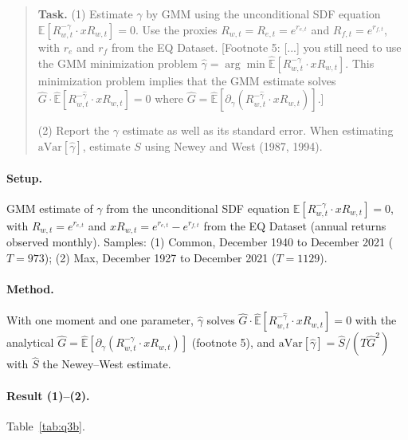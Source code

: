 \documentclass[11pt]{article}
\newcommand{\task}[1]{\begin{quote}\small\textbf{Task.} #1\end{quote}}
\begin{document}
\subsection{}\label{q3b}
\task{(1) Estimate $\gamma$ by GMM using the unconditional SDF equation $\mathbb{E}[R_{w,t}^{-\gamma} \cdot xR_{w,t}] = 0$. Use the proxies $R_{w,t} = R_{e,t} = e^{r_{e,t}}$ and $R_{f,t} = e^{r_{f,t}}$, with $r_e$ and $r_f$ from the EQ Dataset. [Footnote 5: [...] you still need to use the GMM minimization problem $\hat{\gamma} = \arg\min \widehat{\mathbb{E}}[R_{w,t}^{-\gamma} \cdot xR_{w,t}]$. This minimization problem implies that the GMM estimate solves $\hat{G} \cdot \widehat{\mathbb{E}}[R_{w,t}^{-\hat{\gamma}} \cdot xR_{w,t}] = 0$ where $\hat{G} = \widehat{\mathbb{E}}[\partial_\gamma (R_{w,t}^{-\hat{\gamma}} \cdot xR_{w,t})]$.]\par (2) Report the $\gamma$ estimate as well as its standard error. When estimating $\mathrm{aVar}[\hat{\gamma}]$, estimate $S$ using Newey and West (1987, 1994).}
\paragraph{Setup.}
GMM estimate of $\gamma$ from the unconditional SDF equation
$\mathbb{E}[R_{w,t}^{-\gamma} \cdot xR_{w,t}] = 0$, with $R_{w,t} = e^{r_{e,t}}$ and
$xR_{w,t} = e^{r_{e,t}} - e^{r_{f,t}}$ from the EQ Dataset (annual returns observed monthly). Samples:
(1) Common, December 1940 to December 2021 ($T = 973$); (2) Max, December 1927 to December 2021
($T = 1129$).

\paragraph{Method.}
With one moment and one parameter, $\hat{\gamma}$ solves
$\hat{G} \cdot \widehat{\mathbb{E}}[R_{w,t}^{-\hat{\gamma}} \cdot xR_{w,t}] = 0$ with the analytical
$\hat{G} = \widehat{\mathbb{E}}[\partial_\gamma (R_{w,t}^{-\gamma} \cdot xR_{w,t})]$ (footnote 5), and
$\mathrm{aVar}[\hat{\gamma}] = \hat{S} / (T \hat{G}^2)$ with $\hat{S}$ the Newey--West estimate.

\paragraph{Result (1)--(2).}
Table~\ref{tab:q3b}.
\end{document}

